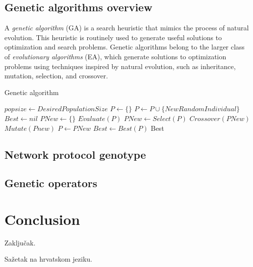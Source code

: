 \documentclass[times, utf8, diplomski]{fer}
\begin{document}
\section{Genetic algorithms overview}
A \emph{genetic algorithm} (GA) is a search heuristic that mimics the process of 
natural evolution. This heuristic is routinely used to generate useful solutions 
to optimization and search problems. Genetic algorithms belong to the larger class 
of \emph{evolutionary algorithms} (EA), which generate solutions to optimization 
problems using techniques inspired by natural evolution, such as inheritance, 
mutation, selection, and crossover.

\begin{algorithm}
\caption{Genetic algorithm}
\label{alg:gen_alg}
\begin{algorithmic}
\STATE $popsize \gets DesiredPopulationSize$
\STATE $P \gets \{\}$
	\STATE $P \gets P \cup \{NewRandomIndividual\}$
\ENDFOR
\STATE $Best \gets nil$
\REPEAT
	\STATE $PNew \gets \{\}$
	\STATE $Evaluate(P)$
	\STATE $PNew \gets Select(P)$
	\STATE $Crossover(PNew)$
	\STATE $Mutate(Pnew)$
	\STATE $P \gets PNew$
	\STATE $Best \gets Best(P)$
\RETURN Best
\end{algorithmic}
\end{algorithm}

\section{Network protocol genotype}
\section{Genetic operators}
\section{}

\chapter{Conclusion}
Zaključak.




\begin{sazetak}
Sažetak na hrvatskom jeziku.

\end{sazetak}
\end{document}
